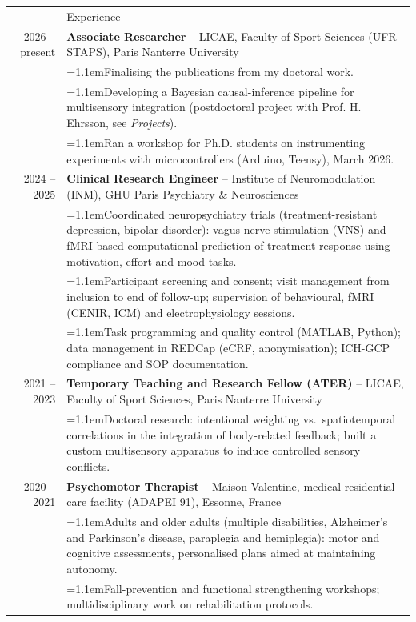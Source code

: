 \documentclass[a4paper, 11pt]{article}
\newcommand{\headingfont}{\Large\color{PineGreen}}
\newcommand{\bul}[1]{\hangindent=1.1em\hangafter=1\makebox[1.1em][l]{--}#1}
\newenvironment{SectionTable}[1]{
	\renewcommand*{\arraystretch}{1.1}
	\setlength{\tabcolsep}{8pt}
	\begin{longtable}{Rp{5.15in}} & #1 \\*}
{\end{longtable}\vspace{2pt}}
\begin{document}
\begin{SectionTable}{\headingfont Experience}
	2026 -- present &
	\textbf{Associate Researcher} -- LICAE, Faculty of Sport Sciences (UFR STAPS), Paris Nanterre University \href{https://licae.parisnanterre.fr/}{\faGlobe} \\
	& \bul{Finalising the publications from my doctoral work.} \\
	& \bul{Developing a Bayesian causal-inference pipeline for multisensory integration (postdoctoral project with Prof. H. Ehrsson, see \textit{Projects}).} \\
	& \bul{Ran a workshop for Ph.D. students on instrumenting experiments with microcontrollers (Arduino, Teensy), March 2026.} \\

	2024 -- 2025 &
	\textbf{Clinical Research Engineer} -- Institute of Neuromodulation (INM), GHU Paris Psychiatry \& Neurosciences \href{https://www.ghu-paris.fr/fr/linstitut-de-neuromodulation}{\faGlobe} \\
	& \bul{Coordinated neuropsychiatry trials (treatment-resistant depression, bipolar disorder): vagus nerve stimulation (VNS) and fMRI-based computational prediction of treatment response using motivation, effort and mood tasks.} \\
	& \bul{Participant screening and consent; visit management from inclusion to end of follow-up; supervision of behavioural, fMRI (CENIR, ICM) and electrophysiology sessions.} \\
	& \bul{Task programming and quality control (MATLAB, Python); data management in REDCap (eCRF, anonymisation); ICH-GCP compliance and SOP documentation.} \\

	2021 -- 2023 &
	\textbf{Temporary Teaching and Research Fellow (ATER)} -- LICAE, Faculty of Sport Sciences, Paris Nanterre University \\
	& \bul{Doctoral research: intentional weighting vs.\ spatiotemporal correlations in the integration of body-related feedback; built a custom multisensory apparatus to induce controlled sensory conflicts.} \\

	2020 -- 2021 &
	\textbf{Psychomotor Therapist} -- Maison Valentine, medical residential care facility (ADAPEI 91), Essonne, France \href{https://adapei91.fr/maison-valentine/}{\faGlobe} \\
	& \bul{Adults and older adults (multiple disabilities, Alzheimer's and Parkinson's disease, paraplegia and hemiplegia): motor and cognitive assessments, personalised plans aimed at maintaining autonomy.} \\
	& \bul{Fall-prevention and functional strengthening workshops; multidisciplinary work on rehabilitation protocols.} \\


\end{SectionTable}
\end{document}
